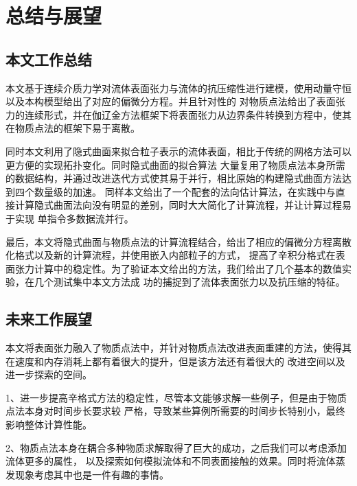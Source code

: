 \chapter{总结与展望}
\section{本文工作总结}
本文基于连续介质力学对流体表面张力与流体的抗压缩性进行建模，使用动量守恒以及本构模型给出了对应的偏微分方程。并且针对性的
对物质点法给出了表面张力的连续形式，并在伽辽金方法框架下将表面张力从边界条件转换到方程中，使其在物质点法的框架下易于离散。

同时本文利用了隐式曲面来拟合粒子表示的流体表面，相比于传统的网格方法可以更方便的实现拓扑变化。同时隐式曲面的拟合算法
大量复用了物质点法本身所需的数据结构，并通过改进迭代方式使其易于并行，相比原始的构建隐式曲面方法达到四个数量级的加速。
同样本文给出了一个配套的法向估计算法，在实践中与直接计算隐式曲面法向没有明显的差别，同时大大简化了计算流程，并让计算过程易于实现
单指令多数据流并行。

最后，本文将隐式曲面与物质点法的计算流程结合，给出了相应的偏微分方程离散化格式以及新的计算流程，并使用嵌入内部粒子的方式，
提高了辛积分格式在表面张力计算中的稳定性。为了验证本文给出的方法，我们给出了几个基本的数值实验，在几个测试集中本文方法成
功的捕捉到了流体表面张力以及抗压缩的特征。
\section{未来工作展望}
本文将表面张力融入了物质点法中，并针对物质点法改进表面重建的方法，使得其在速度和内存消耗上都有着很大的提升，但是该方法还有着很大的
改进空间以及进一步探索的空间。

1、进一步提高辛格式方法的稳定性，尽管本文能够求解一些例子，但是由于物质点法本身对时间步长要求较
严格，导致某些算例所需要的时间步长特别小，最终影响整体计算性能。

2、物质点法本身在耦合多种物质求解取得了巨大的成功，之后我们可以考虑添加流体更多的属性，
以及探索如何模拟流体和不同表面接触的效果。同时将流体蒸发现象考虑其中也是一件有趣的事情。

